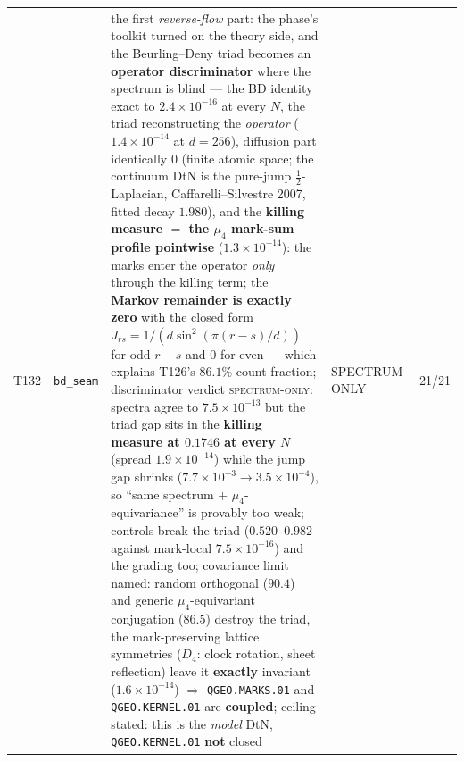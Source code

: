\documentclass[11pt,a4paper]{article}
\begin{document}
{\begin{xltabular}{\linewidth}{@{}p{0.95cm} >{\raggedright\arraybackslash}p{3.1cm} Y >{\raggedright\scriptsize\arraybackslash}p{3.35cm} p{1.15cm}@{}}
T132 & \texttt{\scriptsize bd\_\allowbreak seam} & the first \emph{reverse-flow} part: the phase's toolkit turned on the theory side, and the Beurling--Deny triad becomes an \textbf{operator discriminator} where the spectrum is blind --- the BD identity exact to $2.4\times10^{-16}$ at every $N$, the triad reconstructing the \emph{operator} ($1.4\times10^{-14}$ at $d=256$), diffusion part identically $0$ (finite atomic space; the continuum DtN is the pure-jump $\tfrac12$-Laplacian, Caffarelli--Silvestre 2007, fitted decay $1.980$), and the \textbf{killing measure $=$ the $\mu_4$ mark-sum profile pointwise} ($1.3\times10^{-14}$): the marks enter the operator \emph{only} through the killing term; the \textbf{Markov remainder is exactly zero} with the closed form $J_{rs}=1/(d\sin^2(\pi(r-s)/d))$ for odd $r-s$ and $0$ for even --- which explains T126's $86.1\%$ count fraction; discriminator verdict \textsc{spectrum-only}: spectra agree to $7.5\times10^{-13}$ but the triad gap sits in the \textbf{killing measure at $0.1746$ at every $N$} (spread $1.9\times10^{-14}$) while the jump gap shrinks ($7.7\times10^{-3}\to3.5\times10^{-4}$), so ``same spectrum $+$ $\mu_4$-equivariance'' is provably too weak; controls break the triad ($0.520$--$0.982$ against mark-local $7.5\times10^{-16}$) and the grading too; covariance limit named: random orthogonal ($90.4$) and generic $\mu_4$-equivariant conjugation ($86.5$) destroy the triad, the mark-preserving lattice symmetries ($D_4$: clock rotation, sheet reflection) leave it \textbf{exactly} invariant ($1.6\times10^{-14}$) $\Rightarrow$ \texttt{QGEO.MARKS.01} and \texttt{QGEO.KERNEL.01} are \textbf{coupled}; ceiling stated: this is the \emph{model} DtN, \texttt{QGEO.KERNEL.01} \textbf{not} closed & SPECTRUM-ONLY & 21/21\\

\end{xltabular}}
\end{document}

